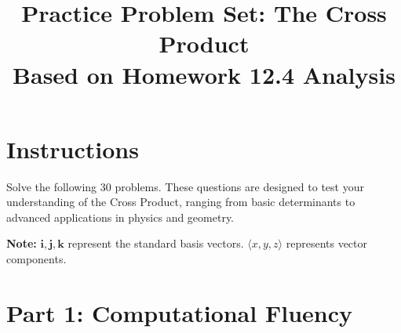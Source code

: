 \documentclass[11pt]{article}
\title{\textbf{Practice Problem Set: The Cross Product}\\ \large Based on Homework 12.4 Analysis}
\author{}
\date{}
\begin{document}
\maketitle

\section*{Instructions}
Solve the following 30 problems. These questions are designed to test your understanding of the Cross Product, ranging from basic determinants to advanced applications in physics and geometry. 

\textbf{Note:} $\mathbf{i}, \mathbf{j}, \mathbf{k}$ represent the standard basis vectors. $\langle x, y, z \rangle$ represents vector components.

\hrulefill

\section*{Part 1: Computational Fluency}
\end{document}
